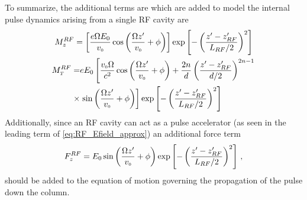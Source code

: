 To summarize, the additional terms are which are added to model the internal pulse dynamics arising from a single RF cavity are
\begin{gather}
  M_{z}^{RF} = \left [ \frac{ e \Omega E_{0} }{ v_{{\scriptscriptstyle 0}} } \cos \left ( \frac{ \Omega z^{\prime} }{ v_{{\scriptscriptstyle 0}} } + \phi \right ) \right ] \exp \left [ - \left (  \frac{ z^{\prime} - z_{RF}^{\prime} }{ L_{RF} / 2 } \right )^{ 2 } \right ] \\
  \begin{aligned}
  M_{{\scriptscriptstyle T}}^{RF} = & e E_{0} \left [ \frac{ v_{{\scriptscriptstyle 0}} \Omega }{c^{2}} \cos \left ( \frac{ \Omega z^{\prime} }{ v_{{\scriptscriptstyle 0}} } + \phi \right ) + \frac{2 n}{d} \left ( \frac{z^{\prime} - z^{\prime}_{RF}}{d / 2} \right )^{2 n - 1} \right. \\ \times & \left. \sin \left ( \frac{ \Omega z^{\prime} }{ v_{{\scriptscriptstyle 0}} } + \phi \right )
   \right ] \exp \left [ - \left (  \frac{ z^{\prime} - z_{RF}^{\prime} }{ L_{RF} / 2 } \right )^{ 2 } \right ]
  \end{aligned}
\end{gather}
Additionally, since an RF cavity can act as a pulse accelerator (as seen in the leading term of \ref{eq:RF_Efield_approx}) an additional force term
\begin{equation}
  F_{z}^{RF} = E_{0} \sin \left ( \frac{ \Omega z^{\prime} }{ v_{{\scriptscriptstyle 0}} } + \phi \right ) \exp \left [ - \left (  \frac{ z^{\prime} - z_{RF}^{\prime} }{ L_{RF} / 2 } \right )^{ 2 } \right ] \, \text{,}
\end{equation}
should be added to the equation of motion governing the propagation of the pulse down the column.
